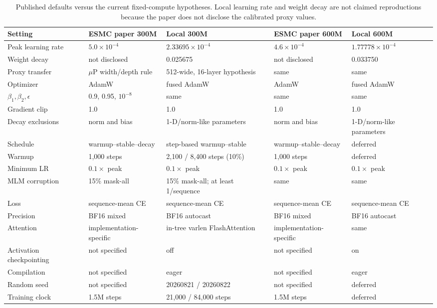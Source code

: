 \documentclass{article}
\begin{document}
\begin{table}[H]
  \centering
  \scriptsize
  \setlength{\tabcolsep}{3.4pt}
  \begin{tabularx}{\textwidth}{@{}p{}YYYY@{}}
    \toprule
    Setting & ESMC paper 300M & Local 300M & ESMC paper 600M & Local 600M \\
    \midrule
    Peak learning rate & $5.0\!\times\!10^{-4}$ & $2.33695\!\times\!10^{-4}$ & $4.6\!\times\!10^{-4}$ & $1.77778\!\times\!10^{-4}$ \\
    Weight decay & not disclosed & 0.025675 & not disclosed & 0.033750 \\
    Proxy transfer & $\mu$P width/depth rule & 512-wide, 16-layer hypothesis & same & same \\
    Optimizer & AdamW & fused AdamW & AdamW & fused AdamW \\
    $\beta_1,\beta_2,\epsilon$ & 0.9, 0.95, $10^{-8}$ & same & same & same \\
    Gradient clip & 1.0 & 1.0 & 1.0 & 1.0 \\
    Decay exclusions & norm and bias & 1-D/norm-like parameters & norm and bias & 1-D/norm-like parameters \\
    Schedule & warmup--stable--decay & step-based warmup--stable & warmup--stable--decay & deferred \\
    Warmup & 1,000 steps & 2,100 / 8,400 steps (10\%) & 1,000 steps & deferred \\
    Minimum LR & $0.1\times$ peak & $0.1\times$ peak & $0.1\times$ peak & $0.1\times$ peak \\
    MLM corruption & 15\% mask-all & 15\% mask-all; at least 1/sequence & same & same \\
    Loss & sequence-mean CE & sequence-mean CE & sequence-mean CE & sequence-mean CE \\
    Precision & BF16 mixed & BF16 autocast & BF16 mixed & BF16 autocast \\
    Attention & implementation-specific & in-tree varlen FlashAttention & implementation-specific & same \\
    Activation checkpointing & not specified & off & not specified & on \\
    Compilation & not specified & eager & not specified & eager \\
    Random seed & not specified & 20260821 / 20260822 & not specified & deferred \\
    Training clock & 1.5M steps & 21,000 / 84,000 steps & 1.5M steps & deferred \\
    \bottomrule
  \end{tabularx}
  \caption{Published defaults versus the current fixed-compute hypotheses. Local learning rate and weight decay are not claimed reproductions because the paper does not disclose the calibrated proxy values.}
  \label{tab:optimization}
\end{table}
\end{document}
